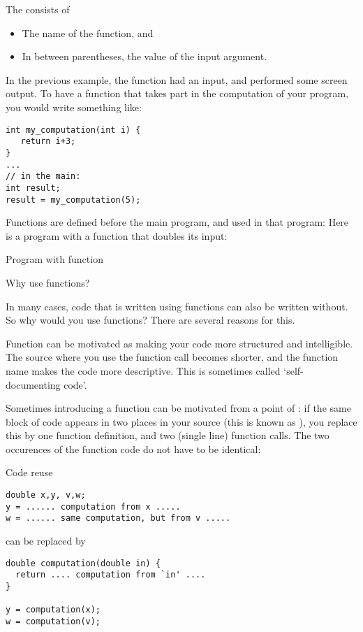 The  consists of
\begin{itemize}
\item The name of the function, and
\item In between parentheses, the value of the input argument.
\end{itemize}

In the previous example, the function had an input, and performed some
screen output. To have a function that takes part in the computation
of your program, you would write something like:
\begin{verbatim}
int my_computation(int i) {
   return i+3;
}
...
// in the main:
int result;
result = my_computation(5);
\end{verbatim}

Functions are defined before the main program, and used in that program:
Here is a program with a function that doubles its input:

\begin{block}{Program with function}
  \label{sl:fun-example}
\end{block}

 {Why use functions?}

In many cases, code that is written using functions can also be
written without. So why would you use functions? There are several
reasons for this.

Function can be motivated as making your code more structured and intelligible.
The source where you use the function call becomes shorter,
and the function
name makes the code more descriptive. This is sometimes called
`self-documenting code'.

Sometimes introducing a function can be motivated from a point of
: if the same block of code appears in two
places in your source (this is known as
), you replace this by one function
definition, and two (single line) function calls.  The two occurences
of the function code do not have to be identical:


\begin{block}{Code reuse}
  \label{sl:reuse}
\begin{verbatim}
double x,y, v,w;
y = ...... computation from x .....
w = ...... same computation, but from v .....
\end{verbatim}
can be replaced by
\begin{verbatim}
double computation(double in) {
  return .... computation from `in' ....
}

y = computation(x);
w = computation(v);
\end{verbatim}
\end{block}

